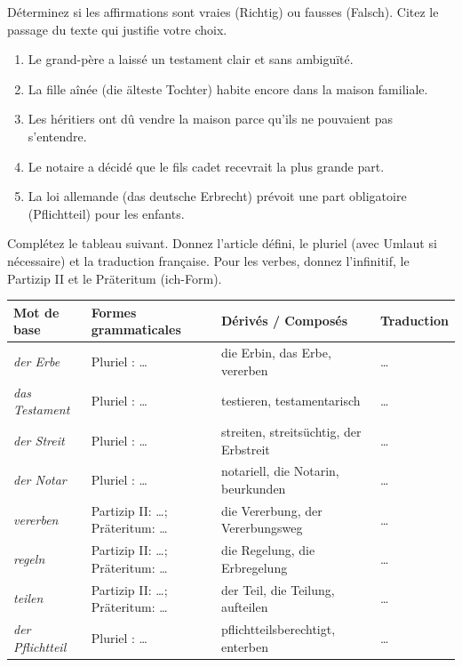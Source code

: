 \documentclass[11pt]{article}
\newcommand{\all}[1]{\ifmmode\text{\textit{#1}}\else\begingroup\selectlanguage{ngerman}\itshape #1\endgroup\fi}
\begin{document}
\begin{exercice}
Déterminez si les affirmations sont vraies (Richtig) ou fausses (Falsch). Citez le passage du texte qui justifie votre choix.
\begin{enumerate}
    \item Le grand-père a laissé un testament clair et sans ambiguïté.
    \item La fille aînée (die älteste Tochter) habite encore dans la maison familiale.
    \item Les héritiers ont dû vendre la maison parce qu'ils ne pouvaient pas s'entendre.
    \item Le notaire a décidé que le fils cadet recevrait la plus grande part.
    \item La loi allemande (das deutsche Erbrecht) prévoit une part obligatoire (Pflichtteil) pour les enfants.
\end{enumerate}
\end{exercice}

\begin{exercice}
Complétez le tableau suivant. Donnez l'article défini, le pluriel (avec Umlaut si nécessaire) et la traduction française. Pour les verbes, donnez l'infinitif, le Partizip II et le Präteritum (ich-Form).
\begin{center}
\begin{tabularx}{\linewidth}{|X|X|X|X|}
\hline
\rowcolor{popblueL} \textbf{Mot de base} & \textbf{Formes grammaticales} & \textbf{Dérivés / Composés} & \textbf{Traduction} \\
\hline
\all{der Erbe} & Pluriel : \dots & die Erbin, das Erbe, vererben & \dots \\
\hline
\all{das Testament} & Pluriel : \dots & testieren, testamentarisch & \dots \\
\hline
\all{der Streit} & Pluriel : \dots & streiten, streitsüchtig, der Erbstreit & \dots \\
\hline
\all{der Notar} & Pluriel : \dots & notariell, die Notarin, beurkunden & \dots \\
\hline
\all{vererben} & Partizip II: \dots ; Präteritum: \dots & die Vererbung, der Vererbungsweg & \dots \\
\hline
\all{regeln} & Partizip II: \dots ; Präteritum: \dots & die Regelung, die Erbregelung & \dots \\
\hline
\all{teilen} & Partizip II: \dots ; Präteritum: \dots & der Teil, die Teilung, aufteilen & \dots \\
\hline
\all{der Pflichtteil} & Pluriel : \dots & pflichtteilsberechtigt, enterben & \dots \\
\hline
\end{tabularx}
\end{center}
\end{exercice}
\end{document}
